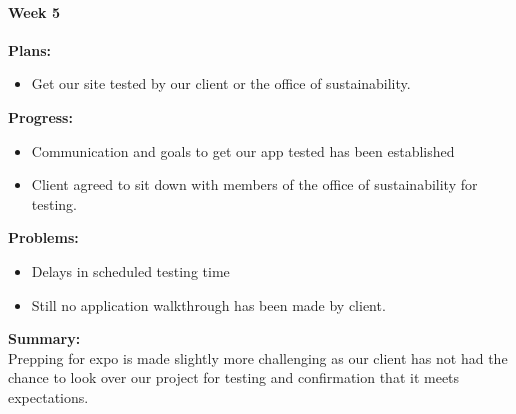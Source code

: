 \paragraph{Week 5}
\begin{adjustwidth}{2.5em}{0pt}
    \vspace{-0.5cm}\textbf{Plans:}
    \vspace{-0.5cm}
    \begin{itemize}
        \item Get our site tested by our client or the office of sustainability.
    \end{itemize} 
    \vspace{-0.3cm}\textbf{Progress:}
    \vspace{-0.5cm}
    \begin{itemize}
        \item Communication and goals to get our app tested has been established
        \item Client agreed to sit down with members of the office of sustainability for testing.
    \end{itemize} 
    \vspace{-0.3cm}\textbf{Problems:}
    \vspace{-0.5cm}
    \begin{itemize}
        \item Delays in scheduled testing time
		\item Still no application walkthrough has been made by client.
    \end{itemize}  
    \vspace{-0.3cm}\noindent\textbf{Summary:}\\
    \noindent Prepping for expo is made slightly more challenging as our client has not had the chance to look over our project for testing and confirmation that it meets expectations.
\end{adjustwidth} 
